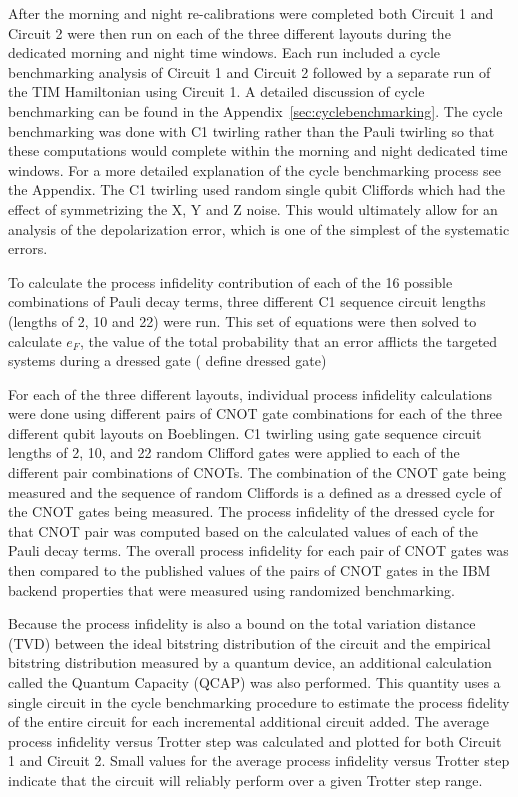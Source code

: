 After the morning and night re-calibrations were completed both Circuit 1 and Circuit 2 were then run on each of the three different layouts during the dedicated morning and night time windows.  Each run included a cycle benchmarking analysis of Circuit 1 and Circuit 2 followed by a separate run of the TIM Hamiltonian using Circuit 1.  A detailed discussion of cycle benchmarking can be found in the Appendix~\ref{sec:cyclebenchmarking}.  The cycle benchmarking was done with C1 twirling rather than the Pauli twirling so that these computations would complete within the morning and night dedicated time windows.  For a more detailed explanation of the cycle benchmarking process see the Appendix.  The C1 twirling used random single qubit Cliffords which had the effect of symmetrizing the X, Y and Z noise.  This would ultimately allow for an analysis of the depolarization error, which is one of the simplest of the systematic errors.  

To calculate the process infidelity contribution of each of the 16 possible combinations of Pauli decay terms, three different C1 sequence circuit lengths (lengths of 2, 10 and 22) were run.  This set of equations were then solved to calculate $e_{F}$, the value of the total probability that an error afflicts the targeted systems during a dressed gate ( 
define dressed gate)

For each of the three different layouts, individual process infidelity calculations were done using different pairs of CNOT gate combinations for each of the three different qubit layouts on Boeblingen.  C1 twirling using gate sequence circuit lengths of 2, 10, and 22 random Clifford gates were applied to each of the different pair combinations of CNOTs.  The combination of the CNOT gate being measured and the sequence of random Cliffords is a defined as a dressed cycle of the CNOT gates being measured.  The process infidelity of the dressed cycle for that CNOT pair was computed based on the calculated values of each of the Pauli decay terms.  The overall process infidelity for each pair of CNOT gates was then compared to the published values of the pairs of CNOT gates in the IBM backend properties that were measured using randomized benchmarking.  

Because the process infidelity is also a bound on the total variation distance (TVD) between the ideal bitstring distribution of the circuit and the empirical bitstring distribution measured by a quantum device, an additional calculation called the Quantum Capacity (QCAP) was also performed.  This quantity uses a single circuit in the cycle benchmarking procedure to estimate the process fidelity of the entire circuit for each incremental additional circuit added.  The average process infidelity versus Trotter step was calculated and plotted for both Circuit 1 and Circuit 2.  Small values for the average process infidelity versus Trotter step indicate that the circuit will reliably perform over a given Trotter step range.  

